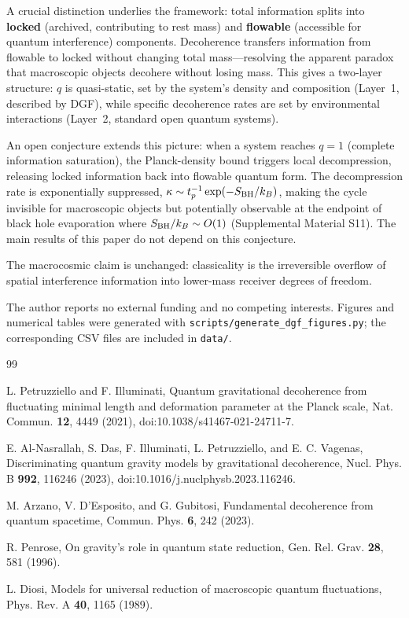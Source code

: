 \documentclass[aps,prl,twocolumn,superscriptaddress,nofootinbib,floatfix]{revtex4-2}
\begin{document}
A crucial distinction underlies the framework: total information splits into \textbf{locked} (archived, contributing to rest mass) and \textbf{flowable} (accessible for quantum interference) components. Decoherence transfers information from flowable to locked without changing total mass---resolving the apparent paradox that macroscopic objects decohere without losing mass. This gives a two-layer structure: $q$ is quasi-static, set by the system's density and composition (Layer~1, described by DGF), while specific decoherence rates are set by environmental interactions (Layer~2, standard open quantum systems).

An open conjecture extends this picture: when a system reaches $q=1$ (complete information saturation), the Planck-density bound triggers local decompression, releasing locked information back into flowable quantum form. The decompression rate is exponentially suppressed, $\kappa\sim t_p^{-1}\exp(-S_{\rm BH}/k_B)$, making the cycle invisible for macroscopic objects but potentially observable at the endpoint of black hole evaporation where $S_{\rm BH}/k_B\sim O(1)$ (Supplemental Material S11). The main results of this paper do not depend on this conjecture.

The macrocosmic claim is unchanged: classicality is the irreversible overflow of spatial interference information into lower-mass receiver degrees of freedom.

\begin{acknowledgments}
The author reports no external funding and no competing interests. Figures and numerical tables were generated with \texttt{scripts/generate\_dgf\_figures.py}; the corresponding CSV files are included in \texttt{data/}.
\end{acknowledgments}

\begin{thebibliography}{99}

L. Petruzziello and F. Illuminati,
Quantum gravitational decoherence from fluctuating minimal length and deformation parameter at the Planck scale,
Nat. Commun. \textbf{12}, 4449 (2021),
doi:10.1038/s41467-021-24711-7.

E. Al-Nasrallah, S. Das, F. Illuminati, L. Petruzziello, and E. C. Vagenas,
Discriminating quantum gravity models by gravitational decoherence,
Nucl. Phys. B \textbf{992}, 116246 (2023),
doi:10.1016/j.nuclphysb.2023.116246.

M. Arzano, V. D'Esposito, and G. Gubitosi,
Fundamental decoherence from quantum spacetime,
Commun. Phys. \textbf{6}, 242 (2023).

R. Penrose,
On gravity's role in quantum state reduction,
Gen. Rel. Grav. \textbf{28}, 581 (1996).

L. Diosi,
Models for universal reduction of macroscopic quantum fluctuations,
Phys. Rev. A \textbf{40}, 1165 (1989).

\end{thebibliography}
\end{document}
